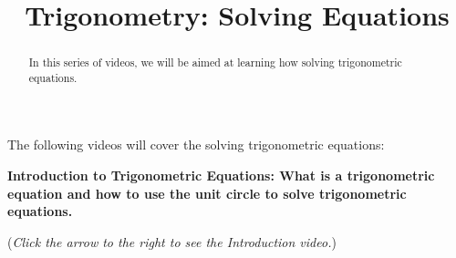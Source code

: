 \documentclass{ximera}
\title[Prerequisite Videos: ]{Trigonometry: Solving Equations}
\begin{document}
\begin{abstract}
  In this series of videos, we will be aimed at learning how
  solving trigonometric equations.
\end{abstract}
\maketitle

The following videos will cover the solving trigonometric equations:

\textbf{Introduction to Trigonometric Equations: What is a trigonometric
equation and how to use the unit circle to solve trigonometric equations.}
\begin{flushright}
{\color{blue}(\emph{Click the arrow to the right to see the Introduction video.})}
\end{flushright}
\begin{center}
\begin{expandable}
\end{expandable}
\end{center}
\end{document}
